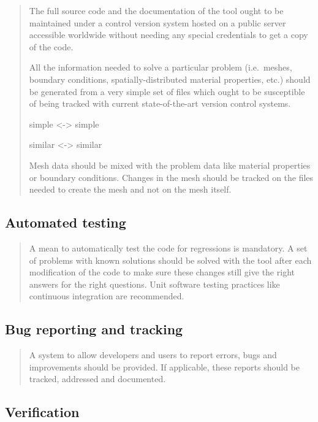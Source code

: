 \documentclass[
  american,
]{article}
\begin{document}
\begin{quote}
The full source code and the documentation of the tool ought to be
maintained under a control version system hosted on a public server
accessible worldwide without needing any special credentials to get a
copy of the code.

All the information needed to solve a particular problem (i.e.~meshes,
boundary conditions, spatially-distributed material properties, etc.)
should be generated from a very simple set of files which ought to be
susceptible of being tracked with current state-of-the-art version
control systems.

simple \textless-\textgreater{} simple

similar \textless-\textgreater{} similar

Mesh data should be mixed with the problem data like material properties
or boundary conditions. Changes in the mesh should be tracked on the
files needed to create the mesh and not on the mesh itself.
\end{quote}

\hypertarget{automated-testing}{%
\subsection{Automated testing}\label{automated-testing}}

\begin{quote}
A mean to automatically test the code for regressions is mandatory. A
set of problems with known solutions should be solved with the tool
after each modification of the code to make sure these changes still
give the right answers for the right questions. Unit software testing
practices like continuous integration are recommended.
\end{quote}

\hypertarget{bug-reporting-and-tracking}{%
\subsection{Bug reporting and
tracking}\label{bug-reporting-and-tracking}}

\begin{quote}
A system to allow developers and users to report errors, bugs and
improvements should be provided. If applicable, these reports should be
tracked, addressed and documented.
\end{quote}

\hypertarget{sec:verification}{%
\subsection{Verification}\label{sec:verification}}
\end{document}
